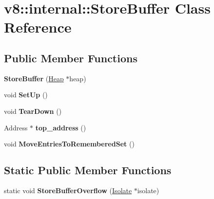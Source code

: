 \hypertarget{classv8_1_1internal_1_1_store_buffer}{}\section{v8\+:\+:internal\+:\+:Store\+Buffer Class Reference}
\label{classv8_1_1internal_1_1_store_buffer}
\subsection*{Public Member Functions}
\begin{DoxyCompactItemize}
\item 
{\bfseries Store\+Buffer} (\hyperlink{classv8_1_1internal_1_1_heap}{Heap} $\ast$heap)\hypertarget{classv8_1_1internal_1_1_store_buffer_afeb036a2c6157abd9b20c2b8ffa28052}{}\label{classv8_1_1internal_1_1_store_buffer_afeb036a2c6157abd9b20c2b8ffa28052}

\item 
void {\bfseries Set\+Up} ()\hypertarget{classv8_1_1internal_1_1_store_buffer_a031dcd4df4a4c83bcb856c70ec4e4fbc}{}\label{classv8_1_1internal_1_1_store_buffer_a031dcd4df4a4c83bcb856c70ec4e4fbc}

\item 
void {\bfseries Tear\+Down} ()\hypertarget{classv8_1_1internal_1_1_store_buffer_ad05bd8e03f20976385f7308304792398}{}\label{classv8_1_1internal_1_1_store_buffer_ad05bd8e03f20976385f7308304792398}

\item 
Address $\ast$ {\bfseries top\+\_\+address} ()\hypertarget{classv8_1_1internal_1_1_store_buffer_ab4b8b19cb1c629044f1c17e028b4f1ab}{}\label{classv8_1_1internal_1_1_store_buffer_ab4b8b19cb1c629044f1c17e028b4f1ab}

\item 
void {\bfseries Move\+Entries\+To\+Remembered\+Set} ()\hypertarget{classv8_1_1internal_1_1_store_buffer_a991cca17f889688ecdab3e71877ba6de}{}\label{classv8_1_1internal_1_1_store_buffer_a991cca17f889688ecdab3e71877ba6de}

\end{DoxyCompactItemize}
\subsection*{Static Public Member Functions}
\begin{DoxyCompactItemize}
\item 
static void {\bfseries Store\+Buffer\+Overflow} (\hyperlink{classv8_1_1internal_1_1_isolate}{Isolate} $\ast$isolate)\hypertarget{classv8_1_1internal_1_1_store_buffer_a9005265f6f854d3db5b098749ef2f616}{}\label{classv8_1_1internal_1_1_store_buffer_a9005265f6f854d3db5b098749ef2f616}

\end{DoxyCompactItemize}
